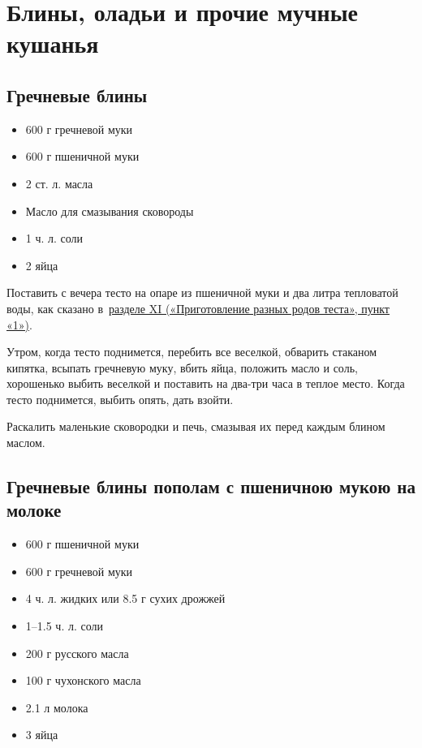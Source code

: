 \newpage
\section{Блины, оладьи и прочие мучные кушанья}

\subsection{Гречневые блины}

\begin{itemize}
	\item 600 г гречневой муки
    \item 600 г пшеничной муки
    \item 2 ст. л. масла
    \item Масло для смазывания сковороды
    \item 1 ч. л. соли
    \item 2 яйца
\end{itemize}

Поставить с вечера тесто на опаре из пшеничной муки и два литра тепловатой воды, как сказано в~\hyperref[sub:drozhzhevoje]{разделе XI («Приготовление разных родов теста», пункт «1»)}.

Утром, когда тесто поднимется, перебить все веселкой, обварить стаканом кипятка, всыпать гречневую муку, вбить яйца, положить масло и соль, хорошенько выбить веселкой и поставить на два-три часа в теплое место. Когда тесто поднимется, выбить опять, дать взойти.

Раскалить маленькие сковородки и печь, смазывая их перед каждым блином маслом.

\subsection{Гречневые блины пополам с пшеничною мукою на молоке}

\begin{itemize}
	\item 600 г пшеничной муки
    \item 600 г гречневой муки
    \item 4 ч. л. жидких или 8.5 г сухих дрожжей 
    \item 1–1.5 ч. л. соли 
    \item 200 г русского масла 
    \item 100 г чухонского масла 
    \item 2.1 л молока 
    \item 3 яйца
\end{itemize}

